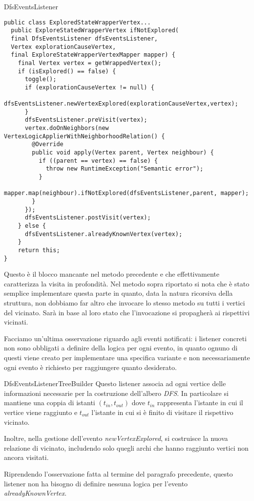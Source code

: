\begin{paragraph}{DfsEventsListener}
\begin{lstlisting}
public class ExploredStateWrapperVertex...
  public ExploreStatedWrapperVertex ifNotExplored(
  final DfsEventsListener dfsEventsListener,
  Vertex explorationCauseVertex,
  final ExploreStateWrapperVertexMapper mapper) {
    final Vertex vertex = getWrappedVertex();
    if (isExplored() == false) {
      toggle();
      if (explorationCauseVertex != null) {
        dfsEventsListener.newVertexExplored(explorationCauseVertex,vertex);
      }
      dfsEventsListener.preVisit(vertex);
      vertex.doOnNeighbors(new VertexLogicApplierWithNeighborhoodRelation() {
        @Override
        public void apply(Vertex parent, Vertex neighbour) {
          if ((parent == vertex) == false) {
            throw new RuntimeException("Semantic error");
          }
          mapper.map(neighbour).ifNotExplored(dfsEventsListener,parent, mapper);
        }
      });
      dfsEventsListener.postVisit(vertex);
    } else {
      dfsEventsListener.alreadyKnownVertex(vertex);
    }
    return this;
}
\end{lstlisting}
Questo \`e il blocco mancante nel metodo precedente e che
effettivamente caratterizza la visita in profondit\`a. Nel metodo
sopra riportato si nota che \`e stato semplice implementare questa
parte in quanto, data la natura ricorsiva della struttura, non
dobbiamo far altro che invocare lo stesso metodo su tutti i vertici
del vicinato. Sar\`a in base al loro stato che l'invocazione si
propagher\`a ai rispettivi vicinati. 

Facciamo un'ultima osservazione riguardo agli eventi notificati: i
listener concreti non sono obbligati a definire della logica per ogni
evento, in quanto ognuno di questi viene creato per implementare una
specifica variante e non necessariamente ogni evento \`e richiesto per
raggiungere quanto desiderato.
\end{paragraph}

\begin{paragraph}{DfsEventsListenerTreeBuilder}
  Questo listener associa ad ogni vertice delle informazioni
  necessarie per la costruzione dell'albero \emph{DFS}. In particolare
  si mantiene una coppia di istanti $(t_{in}, t_{out})$ dove $t_{in}$
  rappresenta l'istante in cui il vertice viene raggiunto e $t_{out}$
  l'istante in cui si \`e finito di visitare il rispettivo vicinato.

  Inoltre, nella gestione dell'evento \emph{newVertexExplored}, si
  costruisce la nuova relazione di vicinato, includendo solo quegli
  archi che hanno raggiunto vertici non ancora visitati.

  Riprendendo l'osservazione fatta al termine del paragrafo
  precedente, questo listener non ha bisogno di definire nessuna
  logica per l'evento \emph{alreadyKnownVertex}.
\end{paragraph}

